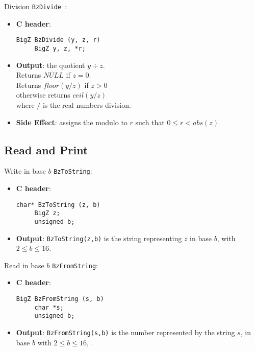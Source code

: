 \begin{func} Division  \verb+BzDivide +:
\begin{itemize}
  \item{\bf C header}:
\begin{verbatim}
BigZ BzDivide (y, z, r)
     BigZ y, z, *r;
\end{verbatim}
  \item{\bf Output}: the quotient $y \div z$.\\
    Returns $NULL$ if $z = 0$.\\
    Returns $floor(y/z)$ if $z > 0$\\
    otherwise returns $ceil(y/z)$\\
    where $/$ is the real numbers division.
  \item{\bf Side Effect}: assigns the modulo to $r$
    such that $0 \leq r < abs(z)$
\end{itemize}
\end{func}
 
\subsection{Read and Print}
 
\begin{func} Write in base $b$  \verb+BzToString+:
\begin{itemize}
  \item{\bf C header}:
\begin{verbatim}
char* BzToString (z, b)
     BigZ z;
     unsigned b;
\end{verbatim}
  \item{\bf Output}: \verb+BzToString(z,b)+ is the string representing
$z$ in base $b$, with $2 \leq b \leq 16$.
\end{itemize}
\end{func}

 
\begin{func} Read in base $b$  \verb+BzFromString+:
\begin{itemize}
  \item{\bf C header}:
\begin{verbatim}
BigZ BzFromString (s, b)
     char *s;
     unsigned b;
\end{verbatim}
  \item{\bf Output}: \verb+BzFromString(s,b)+ is the number represented
by the string $s$, in base $b$ with $2 \leq b \leq 16$, .
\end{itemize}
\end{func}


